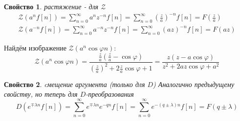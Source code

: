 \documentclass[12pt,twoside]{report}
\newtheorem{property}{Свойство}
\theoremstyle{MyNonumberplain}
\begin{document}
        \begin{property}{растяжение - для $\mathcal{Z}$}
            \begin{eqnarray*}
                \mathcal{Z}(a^n f[n]) = \sum_{n=0}^\infty a^n z^{-n}f[n]=
                \sum_{n=0}^\infty \left(\frac{z}{a}\right)^{-n}f[n]=F\left(\frac{z}{a}\right)\\
                \mathcal{Z}(a^{-n} f[n]) = \sum_{n=0}^\infty a^{-n} z^{-n}f[n]=
                \sum_{n=0}^\infty \left(az\right)^{-n}f[n]=F(az)
            \end{eqnarray*}
        \end{property}
        \begin{example}
            Найдём изображение $\displaystyle \mathcal{Z}(a^n\cos\varphi n)$:
                \begin{equation*}
                    \mathcal{Z}(a^n\cos\varphi n)=\frac{\frac{z}{a}(\frac{z}{a}-\cos\varphi)}{\left(\frac{z}{a}\right)^2+2\frac{z}{a}\cos\varphi+1}
                    =\frac{z(z-a\cos\varphi)}{z^2+2az\cos\varphi+a^2}
                \end{equation*}
        \end{example}

    
        \begin{property}{cмещение аргумента (только для $D$)}
            Аналогично предыдущему свойству, но теперь для $D$-преобразования
                \begin{equation*}
                    D(e^{\mp \lambda n} f[n]) = \sum_{n=0}^\infty e^{\mp \lambda n} e^{-qn}f[n]=
                    \sum_{n=0}^\infty e^{-(q\pm\lambda)n}f[n]=F\left(q\pm\lambda\right)
                \end{equation*}
        \end{property}
    
\end{document}
